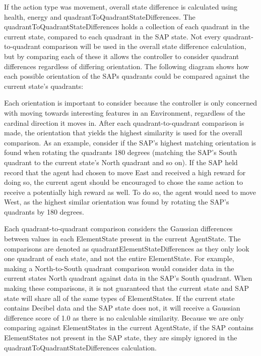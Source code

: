 If the action type was movement, overall state difference is calculated using health, energy and quadrantToQuadrantStateDifferences.
The quadrantToQuadrantStateDifferences holds a collection of each quadrant in the current state, compared to each quadrant in the SAP state.
Not every quadrant-to-quadrant comparison will be used in the overall state difference calculation, but by comparing each of these it allows the controller to consider quadrant differences regardless of differing orientation.
The following diagram shows how each possible orientation of the SAPs quadrants could be compared against the current state's quadrants:


Each orientation is important to consider because the controller is only concerned with moving towards interesting features in an Environment, regardless of the cardinal direction it moves in.
After each quadrant-to-quadrant comparison is made, the orientation that yields the highest similarity is used for the overall comparison.
As an example, consider if the SAP's highest matching orientation is found when rotating the quadrants 180 degrees (matching the SAP's South quadrant to the current state's North quadrant and so on).
If the SAP held record that the agent had chosen to move East and received a high reward for doing so, the current agent should be encouraged to chose the same action to receive a potentially high reward as well.
To do so, the agent would need to move West, as the highest similar orientation was found by rotating the SAP's quadrants by 180 degrees.


Each quadrant-to-quadrant comparison considers the Gaussian differences between values in each ElementState present in the current AgentState.
The comparisons are denoted as quadrantElementStateDifferences as they only look one quadrant of each state, and not the entire ElementState.
For example, making a North-to-South quadrant comparison would consider data in the current states North quadrant against data in the SAP's South quadrant.
When making these comparisons, it is not guaranteed that the current state and SAP state will share all of the same types of ElementStates.
If the current state contains Decibel data and the SAP state does not, it will receive a Gaussian difference score of 1.0 as there is no calculable similarity.
Because we are only comparing against ElementStates in the current AgentState, if the SAP contains ElementStates not present in the SAP state, they are simply ignored in the quadrantToQuadrantStateDifferences calculation.

